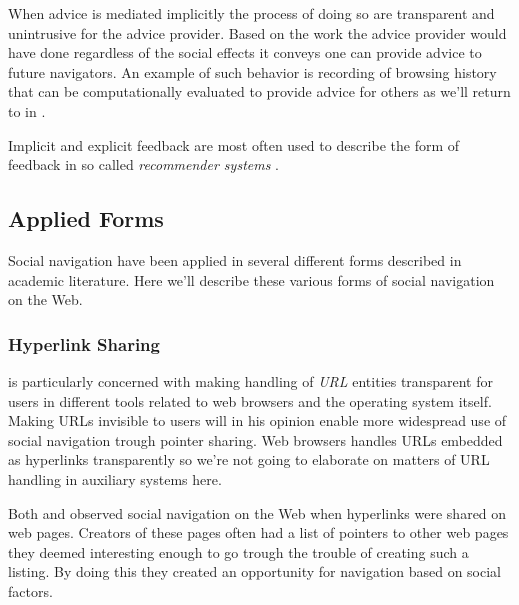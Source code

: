 When advice is mediated implicitly the process of doing so are transparent and
unintrusive for the advice provider. Based on the work the advice provider
would have done regardless of the social effects it conveys one can provide
advice to future navigators. An example of such behavior is recording of
browsing history that can be computationally evaluated to provide advice for
others as we'll return to in
.

Implicit and explicit feedback are most often used to
describe the form of feedback in so called \emph{recommender systems}%
\citep[p.~82]{oard98}.



\subsection{Applied Forms}

Social navigation have been applied in several different forms described in
academic literature. Here we'll describe these various forms of social
navigation on the Web.

\subsubsection{Hyperlink Sharing}

\citet{dieberger97} is particularly concerned with making handling of
\emph{URL}%
entities transparent for users in different tools related to web browsers and
the operating system itself. Making URLs invisible to users will in his
opinion enable more widespread use of social navigation trough pointer
sharing. Web browsers handles URLs embedded as hyperlinks
transparently so we're not going to elaborate on matters of URL handling in
auxiliary systems here.

Both \cite{dourish94} and \cite{dieberger97} observed social navigation on the
Web when hyperlinks were shared on web pages. Creators of these pages often
had a list of pointers to other web pages they deemed interesting enough to go
trough the trouble of creating such a listing. By doing this they created
an opportunity for navigation based on social factors.

